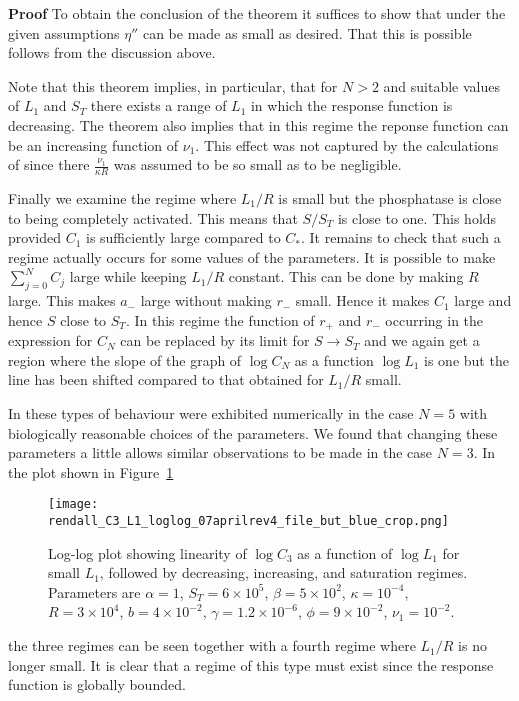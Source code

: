 \documentclass{article}
\begin{document}
\noindent
{\bf Proof} To obtain the conclusion of the theorem it suffices to show 
that under the given assumptions $\eta''$ can be made as small as desired. 
That this is possible follows from the discussion above.

Note that this theorem implies, in particular, that for $N>2$ and suitable 
values of $L_1$ and $S_T$ there exists a range of $L_1$ in which the 
response function is decreasing. The theorem also implies that in this 
regime the reponse function can be an increasing function of $\nu_1$. This 
effect was not captured by the calculations of \cite{francois13} since there
$\frac{\nu_1}{\kappa R}$ was assumed to be so small as to be negligible.

Finally we examine the regime where $L_1/R$ is small but the phosphatase is 
close to being completely activated. This means that $S/S_T$ is
close to one. This holds provided $C_1$ is sufficiently large compared to 
$C_*$. It remains to check that such a regime actually occurs for some 
values of the parameters. It is possible to make $\sum_{j=0}^NC_j$ large 
while keeping $L_1/R$ constant. This can be done by making $R$ large.
This makes $a_-$ large without making $r_-$ small. Hence it makes $C_1$ large
and hence $S$ close to $S_T$. In this regime the function of $r_+$ and $r_-$
occurring in the expression for $C_N$ can be replaced by its limit for 
$S\to S_T$ and we again get a region where the slope of the graph of 
$\log C_N$ as a function $\log L_1$ is one but the line has been shifted
compared to that obtained for $L_1/R$ small.

In \cite{francois13} these types of behaviour were exhibited numerically in
the case $N=5$ with biologically reasonable choices of the parameters. We
found that changing these parameters a little allows similar observations to
be made in the case $N=3$.  In the plot shown in Figure~\ref{fig:regimes}
  \begin{figure}[ht]
\begin{center}
\texttt{[image: rendall\_C3\_L1\_loglog\_07aprilrev4\_file\_but\_blue\_crop.png]}
\end{center}
\caption{%
Log-log plot showing linearity of $\log C_3$ as a function of $\log L_1$ for
small $L_1$, followed by decreasing, increasing, and saturation regimes.
Parameters are
$\alpha =  1$,
$S_T =  6\times10^5$,
$\beta =  5\times10^2$,
$\kappa = 10^{-4}$,
$R =  3\times10^4$,
$b = 4\times10^{-2}$,
$\gamma =  1.2\times10^{-6}$,
$\phi = 9\times10^{-2}$,
$\nu_1 = 10^{-2}$.
}
\label{fig:regimes}
\end{figure}
the three regimes can be seen 
together with a fourth regime where $L_1/R$ is no longer small. It is clear 
that a regime of this type must exist since the response function is globally 
bounded.
\end{document}
